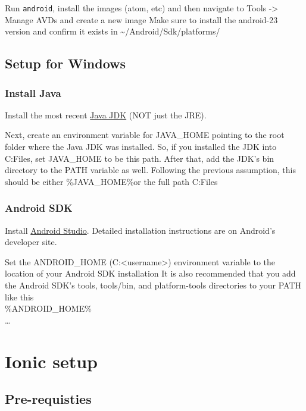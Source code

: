 \documentclass[]{article}
\begin{document}
Run \texttt{android}, install the images (atom, etc) and then navigate
to Tools -\textgreater{} Manage AVDs and create a new image Make sure to
install the android-23 version and confirm it exists in
\textasciitilde{}/Android/Sdk/platforms/

\subsection{Setup for Windows}\label{setup-for-windows}

\subsubsection{Install Java}\label{install-java-1}

Install the most recent
\href{http://www.oracle.com/technetwork/java/javase/downloads/jdk8-downloads-2133151.html}{Java
JDK} (NOT just the JRE).

Next, create an environment variable for JAVA\_HOME pointing to the root
folder where the Java JDK was installed. So, if you installed the JDK
into C:\Program Files\Java{}, set JAVA\_HOME to be this path. After
that, add the JDK's bin directory to the PATH variable as well.
Following the previous assumption, this should be either
\%JAVA\_HOME\%\bin or the full path C:\Program Files\Java{}\bin

\subsubsection{Android SDK}\label{android-sdk}

Install \href{https://developer.android.com/studio/index.html}{Android
Studio}. Detailed installation instructions are on Android's developer
site.

Set the ANDROID\_HOME
(C:\Users\textless{}username\textgreater{}\AppData\Local\Android\Sdk)
environment variable to the location of your Android SDK installation It
is also recommended that you add the Android SDK's tools, tools/bin, and
platform-tools directories to your PATH like this\\
\%ANDROID\_HOME\%\tools \\
\ldots{}

\section{Ionic setup}\label{ionic-setup}

\subsection{Pre-requisties}\label{pre-requisties}
\end{document}
